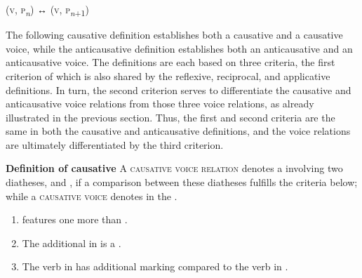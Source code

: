 \smallskip

\noindent
\begin{center}
	 (\textsc{v}, \textsc{p}\textsubscript{\textit{n}}) ↔  (\textsc{v}, \textsc{p}\textsubscript{\textit{n}+1})
\end{center}

\smallskip

The following causative definition establishes both a causative  and a causative voice, while the anticausative definition establishes both an anticausative  and an anticausative voice. The definitions are each based on three criteria, the first criterion of which is also shared by the reflexive, reciprocal, and applicative definitions. In turn, the second criterion serves to differentiate the causative and anticausative voice relations from those three voice relations, as already illustrated in the previous section. Thus, the first and second criteria are the same in both the causative and anticausative definitions, and the voice relations are ultimately differentiated by the third criterion.

\smallskip

\noindent
\begin{center}
	\begin{minipage}{0.80\textwidth}
		\textbf{Definition of causative} \newline
		A \textsc{causative voice relation} denotes a  involving two diatheses,  and , if a comparison between these diatheses fulfills the criteria below; while a \textsc{causative voice} denotes  in the .
		\begin{enumerate}[label=\roman*)]
			\item {} features one  more than .
			\item The additional  in  is a .
			\item The verb in  has additional marking compared to the verb in .
		\end{enumerate}
	\end{minipage}
\end{center}

